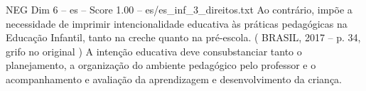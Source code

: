 \begin{textsample}{NEG Dim 6 – es – Score 1.00 – es/es\_inf\_3\_direitos.txt}
Ao contrário, impõe a necessidade de imprimir intencionalidade educativa às práticas pedagógicas na Educação Infantil, tanto na creche quanto na pré-escola. ( BRASIL, 2017 – p. 34, grifo no original ) A intenção educativa deve consubstanciar tanto o planejamento, a organização do ambiente pedagógico pelo professor e o acompanhamento e avaliação da aprendizagem e desenvolvimento da criança.

\end{textsample}
